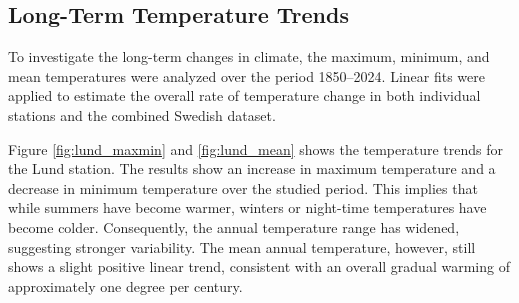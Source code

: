 \subsection{Long-Term Temperature Trends}

To investigate the long-term changes in climate, the maximum, minimum, and mean temperatures were analyzed over the period 1850--2024. Linear fits were applied to estimate the overall rate of temperature change in both individual stations and the combined Swedish dataset.


Figure \ref{fig:lund_maxmin} and \ref{fig:lund_mean} shows the temperature trends for the Lund station. The results show an increase in maximum temperature and a decrease in minimum temperature over the studied period. This implies that while summers have become warmer, winters or night-time temperatures have become colder. Consequently, the annual temperature range has widened, suggesting stronger variability. The mean annual temperature, however, still shows a slight positive linear trend, consistent with an overall gradual warming of approximately one degree per century.

